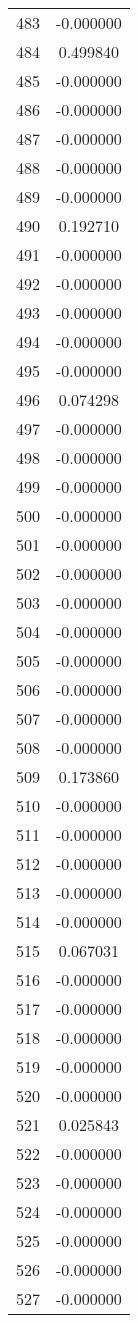 \documentclass[12pt]{article}
\begin{document}
\begin{longtable}{@{}cc@{}}
483 & -0.000000 \\
484 & 0.499840 \\
485 & -0.000000 \\
486 & -0.000000 \\
487 & -0.000000 \\
488 & -0.000000 \\
489 & -0.000000 \\
490 & 0.192710 \\
491 & -0.000000 \\
492 & -0.000000 \\
493 & -0.000000 \\
494 & -0.000000 \\
495 & -0.000000 \\
496 & 0.074298 \\
497 & -0.000000 \\
498 & -0.000000 \\
499 & -0.000000 \\
500 & -0.000000 \\
501 & -0.000000 \\
502 & -0.000000 \\
503 & -0.000000 \\
504 & -0.000000 \\
505 & -0.000000 \\
506 & -0.000000 \\
507 & -0.000000 \\
508 & -0.000000 \\
509 & 0.173860 \\
510 & -0.000000 \\
511 & -0.000000 \\
512 & -0.000000 \\
513 & -0.000000 \\
514 & -0.000000 \\
515 & 0.067031 \\
516 & -0.000000 \\
517 & -0.000000 \\
518 & -0.000000 \\
519 & -0.000000 \\
520 & -0.000000 \\
521 & 0.025843 \\
522 & -0.000000 \\
523 & -0.000000 \\
524 & -0.000000 \\
525 & -0.000000 \\
526 & -0.000000 \\
527 & -0.000000 \\

\end{longtable}
\end{document}
